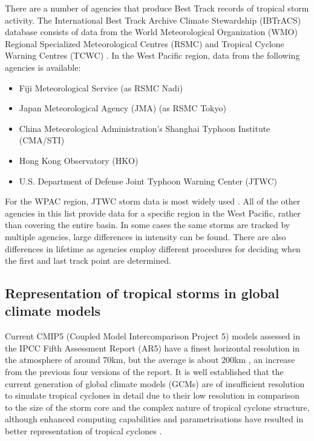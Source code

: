 There are a number of agencies that produce Best Track records of tropical storm activity. The  International Best Track Archive Climate Stewardship (IBTrACS)\citep{knapp2010international} database consists of data from the World Meteorological Organization (WMO) Regional Specialized Meteorological Centres (RSMC) and Tropical Cyclone Warning Centres (TCWC) \citep{knapp2010international}. In the West Pacific region, data from the following agencies is available:

\begin{itemize}
	\item Fiji Meteorological Service (as RSMC Nadi)
	\item Japan Meteorological Agency (JMA) (as RSMC Tokyo)
	\item China Meteorological Administration’s Shanghai Typhoon Institute (CMA/STI)
	\item Hong Kong Observatory (HKO)
	\item U.S. Department of Defense Joint Typhoon Warning Center (JTWC)
\end{itemize}

For the WPAC region, JTWC storm data is most widely used \citep{knapp2010international}. All of the other agencies in this list provide data for a specific region in the West Pacific, rather than covering the entire basin. In some cases the same storms are tracked by multiple agencies, large differences in intensity can be found. There are also differences in lifetime as agencies employ different procedures for deciding when the first and last track point are determined.



\subsection{Representation of tropical storms in global climate models}

Current CMIP5 (Coupled Model Intercomparison Project 5) models assessed in the IPCC Fifth Assessment Report (AR5) have a finest horizontal resolution in the atmosphere of around 70km, but the average is about 200km \citep{climodaus}, an increase from the previous four versions of the report.
It is well established that the current generation of global climate models (GCMs) are of insufficient resolution to simulate tropical cyclones in detail due to their low resolution in comparison to the size of the storm core \citep{lin2012physically} and the complex nature of tropical cyclone structure, although enhanced computing capabilities and parametrisations have resulted in better representation of tropical cyclones \citep{zhao2009simulations, bengtsson2007may, walsh2007objectively}.

